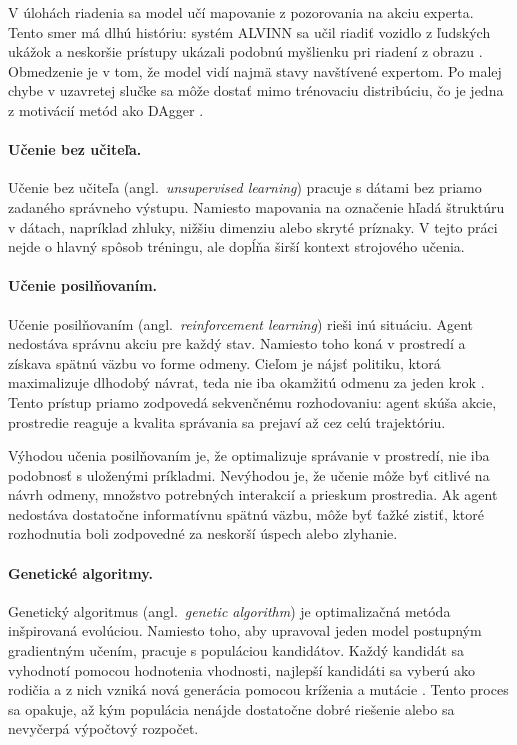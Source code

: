 V úlohách riadenia sa model učí mapovanie z pozorovania na akciu experta. Tento smer má dlhú históriu: systém ALVINN sa učil riadiť vozidlo z ľudských ukážok \cite{pomerleau1989alvinn} a neskoršie prístupy ukázali podobnú myšlienku pri riadení z obrazu \cite{bojarski2016endtoend}. Obmedzenie je v tom, že model vidí najmä stavy navštívené expertom. Po malej chybe v uzavretej slučke sa môže dostať mimo trénovaciu distribúciu, čo je jedna z motivácií metód ako DAgger \cite{ross2011dagger}.

\paragraph{Učenie bez učiteľa.}
Učenie bez učiteľa (angl.~\emph{unsupervised learning}) pracuje s dátami bez priamo zadaného správneho výstupu. Namiesto mapovania na označenie hľadá štruktúru v dátach, napríklad zhluky, nižšiu dimenziu alebo skryté príznaky. V tejto práci nejde o hlavný spôsob tréningu, ale dopĺňa širší kontext strojového učenia.

\paragraph{Učenie posilňovaním.}
Učenie posilňovaním (angl.~\emph{reinforcement learning}) rieši inú situáciu. Agent nedostáva správnu akciu pre každý stav. Namiesto toho koná v prostredí a získava spätnú väzbu vo forme odmeny. Cieľom je nájsť politiku, ktorá maximalizuje dlhodobý návrat, teda nie iba okamžitú odmenu za jeden krok \cite{sutton_barto2018rl}. Tento prístup priamo zodpovedá sekvenčnému rozhodovaniu: agent skúša akcie, prostredie reaguje a kvalita správania sa prejaví až cez celú trajektóriu.

Výhodou učenia posilňovaním je, že optimalizuje správanie v prostredí, nie iba podobnosť s uloženými príkladmi. Nevýhodou je, že učenie môže byť citlivé na návrh odmeny, množstvo potrebných interakcií a prieskum prostredia. Ak agent nedostáva dostatočne informatívnu spätnú väzbu, môže byť ťažké zistiť, ktoré rozhodnutia boli zodpovedné za neskorší úspech alebo zlyhanie.

\paragraph{Genetické algoritmy.}
Genetický algoritmus (angl.~\emph{genetic algorithm}) je optimalizačná metóda inšpirovaná evolúciou. Namiesto toho, aby upravoval jeden model postupným gradientným učením, pracuje s populáciou kandidátov. Každý kandidát sa vyhodnotí pomocou hodnotenia vhodnosti, najlepší kandidáti sa vyberú ako rodičia a z nich vzniká nová generácia pomocou kríženia a mutácie \cite{goldberg1989ga}. Tento proces sa opakuje, až kým populácia nenájde dostatočne dobré riešenie alebo sa nevyčerpá výpočtový rozpočet.

